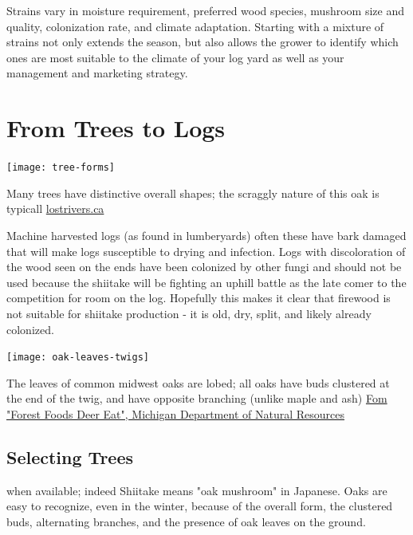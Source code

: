 \documentclass{tufte-handout}
\begin{document}
Strains vary in moisture requirement, preferred wood species, mushroom size and quality, colonization rate, and climate adaptation. 
Starting with a mixture of strains not only extends the season,  but also allows the grower to identify which ones are most
suitable to the climate of your log yard as well as your management
and marketing strategy.

\section{From Trees to Logs}

\begin{marginfigure}
\texttt{[image: tree-forms]}
\caption{Many trees have distinctive overall shapes; the scraggly nature of this oak is typicall \href{http://www.lostrivers.ca/content/points/treeswinter.html}{lostrivers.ca}}
\end{marginfigure}

 Machine harvested logs (as found in lumberyards) often these have bark damaged that will make logs susceptible to drying and infection. 
Logs with discoloration of the wood seen on the ends have been colonized by other fungi and should not be used because the shiitake will be fighting an uphill battle as the late comer to the competition for room on the log.
Hopefully this makes it clear that firewood is not suitable for shiitake production - it is old, dry, split, and likely already colonized.

\begin{marginfigure}
\texttt{[image: oak-leaves-twigs]}
\caption{The leaves of common midwest oaks are lobed; all oaks have buds clustered at the end of the twig, and have opposite branching (unlike maple and ash)  
\href{http://www.michigan.gov/dnr/0,4570,7-153-10370_12148-61306--,00.html}{Fom "Forest Foods Deer Eat", Michigan Department of Natural Resources}
}
\end{marginfigure}

\subsection{Selecting Trees}


 when available; indeed Shiitake means "oak mushroom" in Japanese.   
Oaks are easy to recognize, even in the winter, because of the overall form, the clustered buds, alternating branches, and the presence of oak leaves on the ground.  
\end{document}
